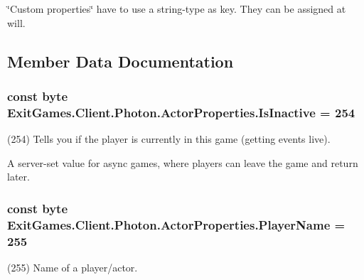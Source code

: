 \char`\"{}\+Custom properties\char`\"{} have to use a string-\/type as key. They can be assigned at will. 

\subsection{Member Data Documentation}
\subsubsection[{\texorpdfstring{Is\+Inactive}{IsInactive}}]{\setlength{\rightskip}{0pt plus 5cm}const byte Exit\+Games.\+Client.\+Photon.\+Actor\+Properties.\+Is\+Inactive = 254}\hypertarget{class_exit_games_1_1_client_1_1_photon_1_1_actor_properties_ab022ff7811e3b59b8de32931f0227087}{}\label{class_exit_games_1_1_client_1_1_photon_1_1_actor_properties_ab022ff7811e3b59b8de32931f0227087}


(254) Tells you if the player is currently in this game (getting events live). 

A server-\/set value for async games, where players can leave the game and return later.
\subsubsection[{\texorpdfstring{Player\+Name}{PlayerName}}]{\setlength{\rightskip}{0pt plus 5cm}const byte Exit\+Games.\+Client.\+Photon.\+Actor\+Properties.\+Player\+Name = 255}\hypertarget{class_exit_games_1_1_client_1_1_photon_1_1_actor_properties_afe2d90b754420c5a5bdea2895f645a46}{}\label{class_exit_games_1_1_client_1_1_photon_1_1_actor_properties_afe2d90b754420c5a5bdea2895f645a46}


(255) Name of a player/actor.

